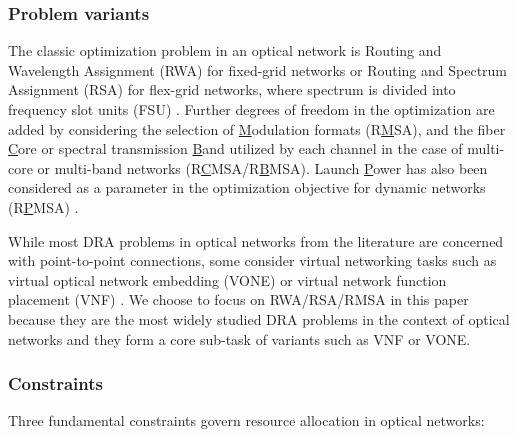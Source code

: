 
\subsubsection*{Problem variants}
The classic optimization problem in an optical network is Routing and Wavelength Assignment (RWA) for fixed-grid networks or Routing and Spectrum Assignment (RSA) for flex-grid networks, where spectrum is divided into frequency slot units (FSU) \cite{mukherjee_springer_2020}. Further degrees of freedom in the optimization are added by considering the selection of \underline{M}odulation formats (R\underline{M}SA), and the fiber \underline{C}ore or spectral transmission \underline{B}and utilized by each channel in the case of multi-core or multi-band networks (R\underline{C}MSA/R\underline{B}MSA). Launch \underline{P}ower has also been considered as a parameter in the optimization objective for dynamic networks (R\underline{P}MSA) \cite{ives_routing_2015} \cite{arpanaei_launch_2023}.%

While most DRA problems in optical networks from the literature are concerned with point-to-point connections, some consider virtual networking tasks such as virtual optical network embedding (VONE) \cite{gong_virtual_2014,doherty_deep_2023} or virtual network function placement (VNF) \cite{zhou_applications_2022}. We choose to focus on RWA/RSA/RMSA in this paper because they are the most widely studied DRA problems in the context of optical networks and they form a core sub-task of variants such as VNF or VONE.



\subsubsection*{Constraints}
Three fundamental constraints govern resource allocation in optical networks:

